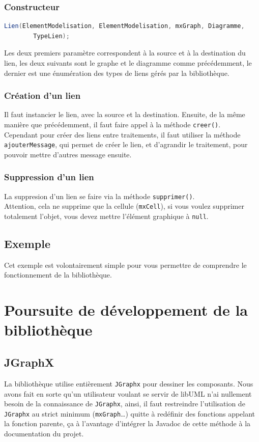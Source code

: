 \documentclass[12pt,a4paper,oneside]{book}
\begin{document}
	\subsection{Constructeur}
	\begin{lstlisting}[language=Java]
Lien(ElementModelisation, ElementModelisation, mxGraph, Diagramme, 
		TypeLien);
	\end{lstlisting}
	Les deux premiers paramètre correspondent à la source et à la destination du lien, les deux suivants sont le graphe et le diagramme comme précédemment, le 
	dernier est une énumération des types de liens gérés par la bibliothèque.
	\subsection{Création d'un lien}
	Il faut instancier le lien, avec la source et la destination. Ensuite, de la même manière que précédemment, il faut faire appel à la méthode \texttt{creer()}.\\
	Cependant pour créer des liens entre traitements, il faut utiliser la méthode \texttt{ajouterMessage}, qui permet de créer le lien, et d'agrandir le traitement,
	pour pouvoir mettre d'autres message ensuite.

	\subsection{Suppression d'un lien}
	La suppresion d'un lien se faire via la méthode \texttt{supprimer()}. \\
	Attention, cela ne supprime que la cellule (\texttt{mxCell}), si vous voulez supprimer totalement l'objet, vous devez mettre l'élément graphique à \texttt{null}.


	\section{Exemple}
	
	Cet exemple est volontairement simple pour vous permettre de comprendre le fonctionnement de la bibliothèque.
	\chapter{Poursuite de développement de la bibliothèque}				
	\nouveauChapitre
	\section{JGraphX}
	La bibliothèque utilise entièrement \texttt{JGraphx} pour dessiner les composants. Nous avons fait en sorte qu'un utilisateur voulant se servir de libUML
	n'ai nullement besoin de la connaissance de \texttt{JGraphx}, ainsi, il faut restreindre l'utilisation de \texttt{JGraphx} au strict minimum (\texttt{mxGraph}\ldots) quitte
	à redéfinir des fonctions appelant la fonction parente, ça à l'avantage d'intégrer la Javadoc de cette méthode à la documentation du projet.
\end{document}
